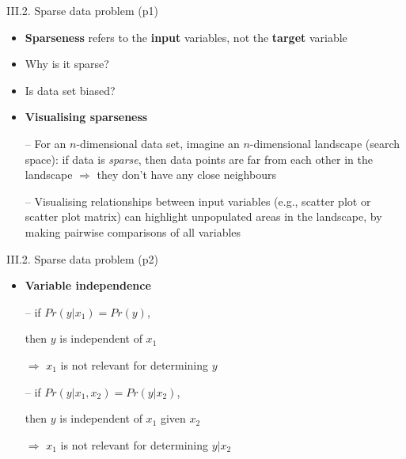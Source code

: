 \documentclass[handout]{beamer}
\newcommand{\strong}[1]{\textbf{\color{teal} #1}}
\newcommand{\stronger}[1]{\textbf{\color{purple} #1}}
\begin{document}
\begin{frame}{III.2. Sparse data problem (p1)}
\begin{itemize}
\item \stronger{Sparseness} refers to the \strong{input} variables, not the \strong{target} variable
\item Why is it sparse? 
\item Is data set biased?
\item[]
\item \strong{Visualising sparseness}
\item[--] For an $n$-dimensional data set, imagine an $n$-dimensional landscape (search space): if data is \emph{sparse}, then data points are far from each other in the landscape $\Rightarrow$ they don't have any close neighbours
\item[--] Visualising relationships between input variables (e.g., scatter plot or scatter plot matrix) can highlight unpopulated areas in the landscape, by making pairwise comparisons of all variables
\end{itemize}
\end{frame}
\begin{frame}{III.2. Sparse data problem (p2)}
\begin{itemize}
\item \strong{Variable independence}
\item[]
\item[--] if $Pr(y|x_1) = Pr(y)$,
\item[] then  $y$ is independent of $x_1$
\item[] $\Rightarrow$ $x_1$ is not relevant for determining $y$
\item[]
\item[--] if $Pr(y|x_1,x_2) = Pr(y|x_2)$,
\item[] then $y$ is independent of $x_1$ given $x_2$
\item[] $\Rightarrow$ $x_1$ is not relevant for determining $y|x_2$
\end{itemize}
\end{frame}
\end{document}
